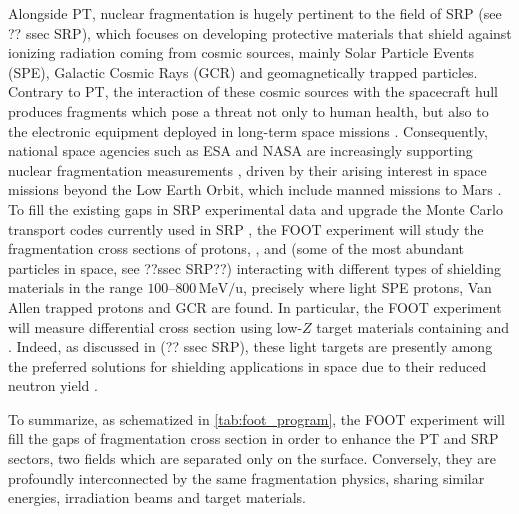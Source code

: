 Alongside PT, nuclear fragmentation is hugely pertinent to the field of SRP (see ?? ssec SRP), which focuses on developing protective materials that shield against ionizing radiation coming from cosmic sources, mainly Solar Particle Events (SPE), Galactic Cosmic Rays (GCR) and geomagnetically trapped particles. Contrary to PT, the interaction of these cosmic sources with the spacecraft hull produces fragments which pose a threat not only to human health, but also to the electronic equipment deployed in long-term space missions \cite{RevModPhys.83.1245}. Consequently, national space agencies such as ESA and NASA are increasingly supporting nuclear fragmentation measurements \cite{Luoni2025}, driven by their arising interest in space missions beyond the Low Earth Orbit, which include manned missions to Mars \cite{DURANTE20142}. To fill the existing gaps in SRP experimental data \cite{Norbury2012} and upgrade the Monte Carlo transport codes currently used in SRP \cite{HEINBOCKEL20111079}, the FOOT experiment will study the fragmentation cross sections of protons, ,  and  (some of the most abundant particles in space, see ??ssec SRP??) interacting with different types of shielding materials in the range $100$--$800\,\mathrm{MeV/u}$, precisely where light SPE protons, Van Allen trapped protons and GCR are found. In particular, the FOOT experiment will measure differential cross section using low-$Z$ target materials containing  and . Indeed, as discussed in (?? ssec SRP), these light targets are presently among the preferred solutions for shielding applications in space due to their reduced neutron yield \cite{articleShielding}.

To summarize, as schematized in \autoref{tab:foot_program}, the FOOT experiment will fill the gaps of fragmentation cross section in order to enhance the PT and SRP sectors, two fields which are separated only on the surface. Conversely, they are profoundly interconnected by the same fragmentation physics, sharing similar energies, irradiation beams and target materials.
